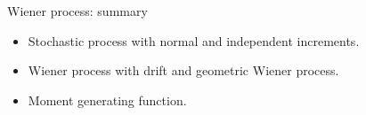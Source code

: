 \begin{frame}{Wiener process: summary}

\begin{itemize}[<+->]
    \item Stochastic process with \alert{normal} and \alert{independent increments}.
    \item Wiener process with \alert{drift} and \alert{geometric Wiener process}. 
    \item \alert{Moment generating function}. 
\end{itemize}
  
\end{frame}
